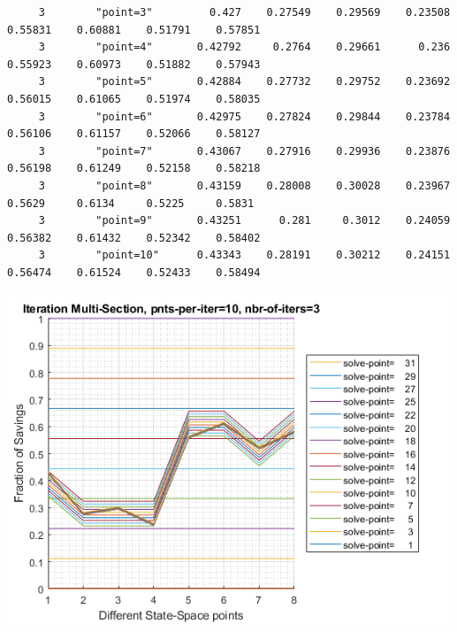 \documentclass[
]{book}
\begin{document}
\begin{verbatim}
     3        "point=3"         0.427    0.27549    0.29569    0.23508    0.55831    0.60881    0.51791    0.57851
     3        "point=4"       0.42792     0.2764    0.29661      0.236    0.55923    0.60973    0.51882    0.57943
     3        "point=5"       0.42884    0.27732    0.29752    0.23692    0.56015    0.61065    0.51974    0.58035
     3        "point=6"       0.42975    0.27824    0.29844    0.23784    0.56106    0.61157    0.52066    0.58127
     3        "point=7"       0.43067    0.27916    0.29936    0.23876    0.56198    0.61249    0.52158    0.58218
     3        "point=8"       0.43159    0.28008    0.30028    0.23967     0.5629     0.6134     0.5225     0.5831
     3        "point=9"       0.43251      0.281     0.3012    0.24059    0.56382    0.61432    0.52342    0.58402
     3        "point=10"      0.43343    0.28191    0.30212    0.24151    0.56474    0.61524    0.52433    0.58494
\end{verbatim}

\includegraphics[width=5.20833in,height=\textheight]{img/fx_optim_mlsec_savezrone_images/figure_1.png}
\end{document}
